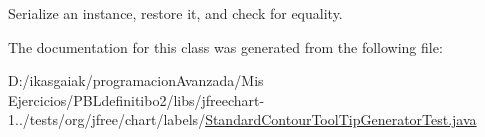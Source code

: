 Serialize an instance, restore it, and check for equality. 

The documentation for this class was generated from the following file\+:\begin{DoxyCompactItemize}
\item 
D\+:/ikasgaiak/programacion\+Avanzada/\+Mis Ejercicios/\+P\+B\+Ldefinitibo2/libs/jfreechart-\/1../tests/org/jfree/chart/labels/\mbox{\hyperlink{_standard_contour_tool_tip_generator_test_8java}{Standard\+Contour\+Tool\+Tip\+Generator\+Test.\+java}}\end{DoxyCompactItemize}
